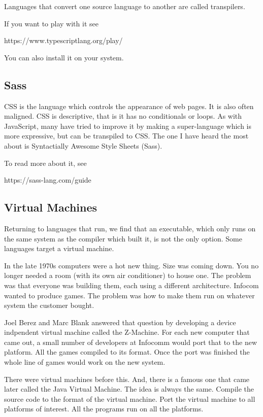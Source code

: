 Languages that convert one source language to another are called transpilers.

If you want to play with it see

    https://www.typescriptlang.org/play/

You can also install it on your system.

\subsection{Sass}

CSS is the language which controls the appearance of web pages. It is
also often maligned. CSS is descriptive, that is it has no conditionals
or loops. As with JavaScript, many have tried to improve it by making
a super-language which is more expressive, but can be transpiled to CSS.
The one I have heard the most about is Syntactially Awesome Style Sheets
(Sass).

To read more about it, see

    https://sass-lang.com/guide

\subsection{Virtual Machines}

Returning to languages that run, we find that an executable, which only
runs on the same system as the compiler which built it, is not the only
option. Some languages target a virtual machine.

In the late 1970s computers were a hot new thing. Size was coming down.
You no longer needed a room (with its own air conditioner) to house one.
The problem was that everyone was building them, each using a different
architecture. Infocom wanted to produce games. The problem was how to
make them run on whatever system the customer bought.

Joel Berez and Marc Blank answered that question by developing a
device indpendent virtual machine called the Z-Machine. For each new
computer that came out, a small number of developers at Infocomm
would port that to the new platform. All the games compiled to its
format. Once the port was finished the whole line of games would
work on the new system.

There were virtual machines before this. And, there is a famous one
that came later called the Java Virtual Machine. The idea is always
the same. Compile the source code to the format of the virtual machine.
Port the virtual machine to all platforms of interest. All the programs
run on all the platforms.

